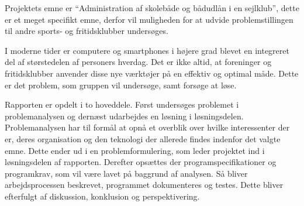 Projektets emne er ``Administration af skolebåde og bådudlån i en sejlklub'', dette er et meget specifikt
emne, derfor vil  muligheden for at udvide problemstillingen til andre sports- og fritidsklubber undersøges.

I moderne tider er computere og smartphones i højere grad blevet en integreret del af størstedelen af
personers hverdag.  \citep{dstSPogPC} Det er ikke altid, at foreninger og fritidsklubber anvender disse nye
værktøjer på en effektiv og optimal måde. Dette er det problem, som gruppen vil undersøge, samt forsøge at løse.

Rapporten er opdelt i to hoveddele. Først undersøges problemet i problemanalysen og dernæst udarbejdes en
løsning i løsningsdelen. Problemanalysen har til formål at opnå et overblik over hvilke interessenter der er,
deres organisation og den teknologi der allerede findes indenfor det valgte emne. 
Dette ender ud i en problemformulering, som leder projektet ind i løsningsdelen af rapporten. 
Derefter opsættes der programspecifikationer og programkrav, som vil være lavet på baggrund af analysen. 
Så bliver arbejdsprocessen beskrevet, programmet dokumenteres og testes. 
Dette bliver efterfulgt af diskussion, konklusion og perspektivering.

